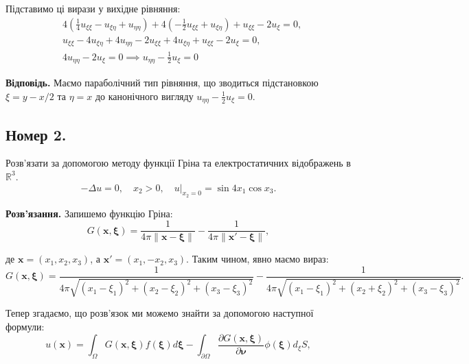 \documentclass{hw_template}
\begin{document}
Підставимо ці вирази у вихідне рівняння:
\begin{align*}
    &4\left(\frac{1}{4}u_{\xi\xi} - u_{\xi\eta} + u_{\eta\eta}\right) + 4\left(-\frac{1}{2}u_{\xi\xi} + u_{\xi\eta}\right) + u_{\xi\xi} - 2u_{\xi} = 0, \\
    &u_{\xi\xi} - 4u_{\xi\eta} + 4u_{\eta\eta} - 2u_{\xi\xi} + 4u_{\xi\eta} + u_{\xi\xi} - 2u_{\xi} = 0, \\
    &4u_{\eta\eta} - 2u_{\xi} = 0 \implies \boxed{u_{\eta\eta} - \frac{1}{2}u_{\xi} = 0}
\end{align*}


\textbf{Відповідь.} Маємо параболічний тип рівняння, що зводиться підстановкою $\xi=y-x/2$ та $\eta=x$ до канонічного вигляду $u_{\eta\eta} - \frac{1}{2}u_{\xi} = 0$.

\newpage

\subsection{Номер 2.}

\begin{problem}
    Розв'язати за допомогою методу функції Гріна та електростатичних відображень в $\mathbb{R}^3$.
    \begin{equation*}
        -\Delta u = 0, \quad x_2 > 0, \quad u\Big|_{x_2=0} = \sin 4x_1 \cos x_3.
    \end{equation*}
\end{problem}

\textbf{Розв'язання.} Запишемо функцію Гріна:
\begin{equation*}
    G(\mathbf{x}, \boldsymbol{\xi}) = \frac{1}{4\pi\|\mathbf{x}-\boldsymbol{\xi}\|} - \frac{1}{4\pi\|\mathbf{x}'-\boldsymbol{\xi}\|},
\end{equation*}

де $\mathbf{x}=(x_1,x_2,x_3)$, а $\mathbf{x}'=(x_1,-x_2,x_3)$. Таким чином, явно маємо вираз:
\begin{equation*}
    G(\mathbf{x}, \boldsymbol{\xi}) = \frac{1}{4\pi\sqrt{(x_1-\xi_1)^2+(x_2-\xi_2)^2+(x_3-\xi_3)^2}} - \frac{1}{4\pi\sqrt{(x_1-\xi_1)^2+(x_2+\xi_2)^2+(x_3-\xi_3)^2}}.
\end{equation*}

Тепер згадаємо, що розв'язок ми можемо знайти за допомогою наступної формули:
\begin{equation*}
    u(\mathbf{x}) = \int_{\Omega}G(\mathbf{x},\boldsymbol{\xi})f(\boldsymbol{\xi})d\boldsymbol{\xi} - \int_{\partial\Omega} \frac{\partial G(\mathbf{x},\boldsymbol{\xi})}{\partial\boldsymbol{\nu}}\phi(\boldsymbol{\xi})d_{\xi}S,
\end{equation*}
\end{document}

